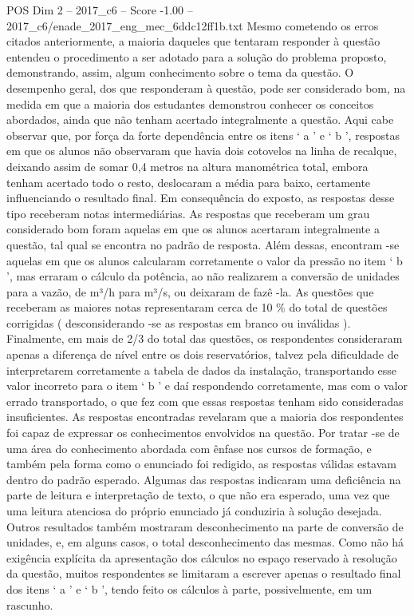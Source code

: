 \begin{textsample}{POS Dim 2 – 2017\_c6 – Score -1.00 – 2017\_c6/enade\_2017\_eng\_mec\_6ddc12ff1b.txt}
Mesmo cometendo os erros citados anteriormente, a maioria daqueles que tentaram responder à questão entendeu o procedimento a ser adotado para a solução do problema proposto, demonstrando, assim, algum conhecimento sobre o tema da questão.
O desempenho geral, dos que responderam à questão, pode ser considerado bom, na medida em que a maioria dos estudantes demonstrou conhecer os conceitos abordados, ainda que não tenham acertado integralmente a questão.
Aqui cabe observar que, por força da forte dependência entre os itens ‘ a ’ e ‘ b ’, respostas em que os alunos não observaram que havia dois cotovelos na linha de recalque, deixando assim de somar 0,4 metros na altura manométrica total, embora tenham acertado todo o resto, deslocaram a média para baixo, certamente influenciando o resultado final.
Em consequência do exposto, as respostas desse tipo receberam notas intermediárias.
As respostas que receberam um grau considerado bom foram aquelas em que os alunos acertaram integralmente a questão, tal qual se encontra no padrão de resposta.
Além dessas, encontram -se aquelas em que os alunos calcularam corretamente o valor da pressão no item ‘ b ’, mas erraram o cálculo da potência, ao não realizarem a conversão de unidades para a vazão, de m³/h para m³/s, ou deixaram de fazê -la.
As questões que receberam as maiores notas representaram cerca de 10 \% do total de questões corrigidas ( desconsiderando -se as respostas em branco ou inválidas ).
Finalmente, em mais de 2/3 do total das questões, os respondentes consideraram apenas a diferença de nível entre os dois reservatórios, talvez pela dificuldade de interpretarem corretamente a tabela de dados da instalação, transportando esse valor incorreto para o item ‘ b ’ e daí respondendo corretamente, mas com o valor errado transportado, o que fez com que essas respostas tenham sido consideradas insuficientes.
As respostas encontradas revelaram que a maioria dos respondentes foi capaz de expressar os conhecimentos envolvidos na questão.
Por tratar -se de uma área do conhecimento abordada com ênfase nos cursos de formação, e também pela forma como o enunciado foi redigido, as respostas válidas estavam dentro do padrão esperado.
Algumas das respostas indicaram uma deficiência na parte de leitura e interpretação de texto, o que não era esperado, uma vez que uma leitura atenciosa do próprio enunciado já conduziria à solução desejada.
Outros resultados também mostraram desconhecimento na parte de conversão de unidades, e, em alguns casos, o total desconhecimento das mesmas.
Como não há exigência explícita da apresentação dos cálculos no espaço reservado à resolução da questão, muitos respondentes se limitaram a escrever apenas o resultado final dos itens ‘ a ’ e ‘ b ’, tendo feito os cálculos à parte, possivelmente, em um rascunho.

\end{textsample}
